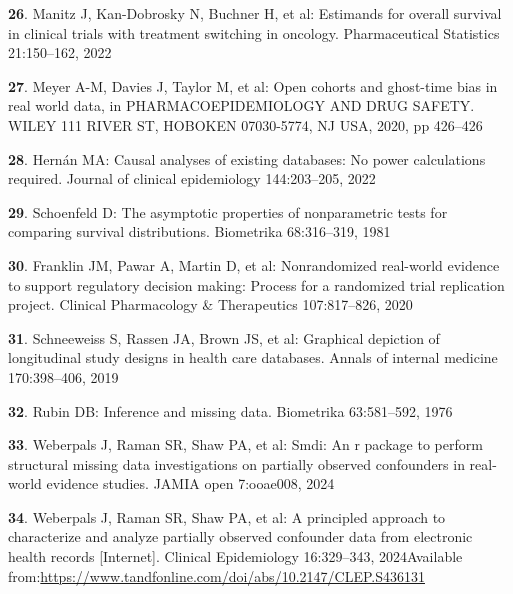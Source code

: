 \documentclass[
  letterpaper,
  DIV=11,
  numbers=noendperiod]{scrartcl}
\newlength{\cslhangindent}
\newenvironment{CSLReferences}[2] %
 {\begin{list}{}{%
  \setlength{\itemindent}{0pt}
  \setlength{\leftmargin}{0pt}
  \setlength{\parsep}{0pt}
  \ifodd #1
   \setlength{\leftmargin}{\cslhangindent}
   \setlength{\itemindent}{-1\cslhangindent}
  \fi
  \setlength{\itemsep}{#2\baselineskip}}}
 {\end{list}}
\begin{document}
\begin{CSLReferences}{0}{1}
\textbf{26}. Manitz J, Kan-Dobrosky N, Buchner H, et al: Estimands for
overall survival in clinical trials with treatment switching in
oncology. Pharmaceutical Statistics 21:150--162, 2022

\textbf{27}. Meyer A-M, Davies J, Taylor M, et al: Open cohorts and
ghost-time bias in real world data, in PHARMACOEPIDEMIOLOGY AND DRUG
SAFETY. WILEY 111 RIVER ST, HOBOKEN 07030-5774, NJ USA, 2020, pp
426--426

\textbf{28}. Hernán MA: Causal analyses of existing databases: No power
calculations required. Journal of clinical epidemiology 144:203--205,
2022

\textbf{29}. Schoenfeld D: The asymptotic properties of nonparametric
tests for comparing survival distributions. Biometrika 68:316--319, 1981

\textbf{30}. Franklin JM, Pawar A, Martin D, et al: Nonrandomized
real-world evidence to support regulatory decision making: Process for a
randomized trial replication project. Clinical Pharmacology \&
Therapeutics 107:817--826, 2020

\textbf{31}. Schneeweiss S, Rassen JA, Brown JS, et al: Graphical
depiction of longitudinal study designs in health care databases. Annals
of internal medicine 170:398--406, 2019

\textbf{32}. Rubin DB: Inference and missing data. Biometrika
63:581--592, 1976

\textbf{33}. Weberpals J, Raman SR, Shaw PA, et al: Smdi: An r package
to perform structural missing data investigations on partially observed
confounders in real-world evidence studies. JAMIA open 7:ooae008, 2024

\textbf{34}. Weberpals J, Raman SR, Shaw PA, et al: A principled
approach to characterize and analyze partially observed confounder data
from electronic health records {[}Internet{]}. Clinical Epidemiology
16:329--343, 2024Available
from:\href{\%20\%0A\%20\%20\%20\%20\%0A\%20\%20\%20\%20\%0A\%20\%20\%20\%20\%20\%20\%20\%20https://www.tandfonline.com/doi/abs/10.2147/CLEP.S436131\%0A\%20\%20\%20\%20\%0A\%0A}{https://www.tandfonline.com/doi/abs/10.2147/CLEP.S436131
}


\end{CSLReferences}
\end{document}
